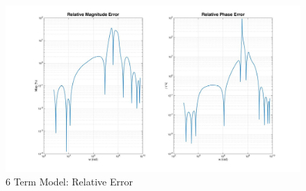 \begin{figure}[ht!]
\ifisPPT
\noindent{}
\else
\includegraphics[keepaspectratio=true,width=6in]{./figures/regression/fullModel_Rel.jpg}
\fi
\centering
\caption{6 Term Model: Relative Error}
\label{fig:fullModel_Rel}
\end{figure}

